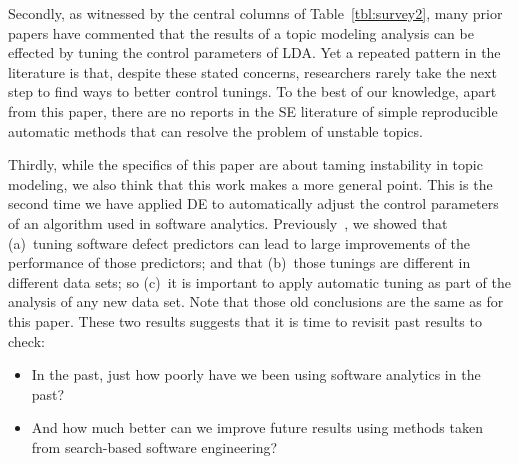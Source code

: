 \documentclass[10pt,conference]{IEEEtran}
\newcommand{\bi}{\begin{itemize}}
\newcommand{\ei}{\end{itemize}}
\theoremstyle{break}
\begin{document}
Secondly, as
witnessed by the central columns of Table~\ref{tbl:survey2},
many prior papers have
commented that the results of a topic modeling analysis can be effected by
tuning the control parameters of LDA.  Yet a repeated pattern in the literature
is that, despite these stated concerns,
researchers rarely take the next step
to find ways to better control tunings.
To the best of our knowledge, apart from this paper, there are no reports in the SE literature
of simple reproducible automatic methods that can resolve the problem of unstable topics.




Thirdly, while the specifics of this paper are about taming instability in topic modeling,
we also think that this work makes a more general point.
      This is the second time we have applied DE to automatically
      adjust the control parameters of an algorithm
      used in software analytics. Previously~\cite{fu2016tuning},
      we showed  that (a)~tuning software defect predictors can lead to large improvements of the performance
      of those predictors; and that (b)~those tunings are different in different data sets; so (c)~it is important to apply
      automatic tuning as part of the analysis of any new data set. Note that those old conclusions are the same
      as for this paper. These two results suggests that it is time to revisit
      past results to check:
      \bi
    \item
       In the past, just
      how poorly have we been using software analytics
      in the past?
    \item
      And how much better can we improve future results using methods taken from search-based
      software engineering?
      \ei





\end{document}
